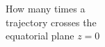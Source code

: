 \documentclass[preview]{standalone}
\begin{document}
How many times a\\trajectory crosses the\\equatorial plane $z=0$\\
\end{document}
